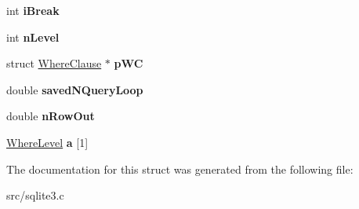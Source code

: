 \begin{DoxyCompactItemize}
\item 
\hypertarget{struct_where_info_a338ac73b84c81db455ad7db56b5e4a06}{int {\bfseries i\-Break}}\label{struct_where_info_a338ac73b84c81db455ad7db56b5e4a06}

\item 
\hypertarget{struct_where_info_ab04fa676e481a8df69107201a362c686}{int {\bfseries n\-Level}}\label{struct_where_info_ab04fa676e481a8df69107201a362c686}

\item 
\hypertarget{struct_where_info_aad633b9e8b7ff4046fcfe798729c591a}{struct \hyperlink{struct_where_clause}{Where\-Clause} $\ast$ {\bfseries p\-W\-C}}\label{struct_where_info_aad633b9e8b7ff4046fcfe798729c591a}

\item 
\hypertarget{struct_where_info_a42261b8c4fbc968e0096fa13ea4c00a7}{double {\bfseries saved\-N\-Query\-Loop}}\label{struct_where_info_a42261b8c4fbc968e0096fa13ea4c00a7}

\item 
\hypertarget{struct_where_info_aca7831db346643eddd5520c3bce4b7bb}{double {\bfseries n\-Row\-Out}}\label{struct_where_info_aca7831db346643eddd5520c3bce4b7bb}

\item 
\hypertarget{struct_where_info_a427337160cbeaf64b23a8241fb10dbf9}{\hyperlink{struct_where_level}{Where\-Level} {\bfseries a} \mbox{[}1\mbox{]}}\label{struct_where_info_a427337160cbeaf64b23a8241fb10dbf9}

\end{DoxyCompactItemize}


The documentation for this struct was generated from the following file\-:\begin{DoxyCompactItemize}
\item 
src/sqlite3.\-c\end{DoxyCompactItemize}
